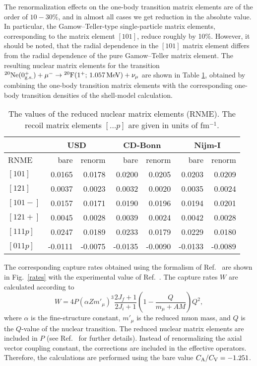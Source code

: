 \documentclass[12pt]{iopart}
\begin{document}
The renormalization effects on the one-body transition matrix elements are
of the order of $10-30\%$, and in almost all cases we get reduction in the
absolute value.
In particular, the Gamow--Teller-type single-particle matrix elements,
corresponding to the matrix element $[101]$, reduce roughly by 10\%. However, it
should be noted, that the radial dependence in the $[101]$ matrix element
differs from the radial dependence of the pure Gamow--Teller matrix element.
The resulting nuclear
matrix elements for the transition $^{20}{\rm Ne}(0^+_{\rm g.s.})+\mu^-
\to {}^{20}{\rm F}(1^+;\, 1.057\, {\rm MeV})+\nu_\mu$
are shown in Table \ref{nme}, obtained by combining the one-body transition
matrix elements with the corresponding one-body transition densities of the
shell-model calculation.
\begin{table}
\caption{The values of the reduced nuclear matrix elements (RNME). The recoil
        matrix elements $[\dots p]$ are given in units of fm$^{-1}$.}
\begin{indented}\item[]
\begin{tabular}{lrrrrrr}\hline
             &\multicolumn{2}{c}{USD} &\multicolumn{2}{c}{CD-Bonn}&
             \multicolumn{2}{c}{Nijm-I}\\\hline
        RNME & bare & renorm & bare & renorm& bare & renorm \\
        \hline
        $[101]$  &  0.0165 &  0.0178 &  0.0200 &  0.0205 &0.0203 &0.0209 \\
        $[121]$  &  0.0037 &  0.0023 &  0.0032 &  0.0020 &0.0035 &0.0024 \\
        $[101-]$ &  0.0157 &  0.0171 &  0.0190 &  0.0196 &0.0194 &0.0201\\
        $[121+]$ &  0.0045 &  0.0028 &  0.0039 &  0.0024 &0.0042 &0.0028\\
        $[111p]$ &  0.0247 &  0.0189 &  0.0233 &  0.0179 &0.0229 &0.0180\\
        $[011p]$ & -0.0111 & -0.0075 & -0.0135 & -0.0090 &-0.0133 &-0.0089\\
        \hline
\end{tabular}
\end{indented}
\label{nme}
\end{table}
The corresponding capture rates 
obtained using the formalism of Ref.\ \cite{mor60} are shown
in Fig.\ \ref{rates} with the experimental value of Ref.\ \cite{fil98}.
The capture rates $W$ are calculated according to
        \begin{equation}\label{W}
        W=4P(\alpha Zm'_\mu)^3\frac{2J_f+1}{2J_i+1}\left(1-\frac{Q}{m_\mu+
        AM}\right)Q^2,
        \end{equation}
where $\alpha$ is the fine-structure constant, $m'_\mu$ is the reduced muon
mass, and $Q$ is the $Q$-value of the nuclear transition. The reduced
nuclear matrix
elements are included in $P$ (see Ref.\ \cite{mor60} for further details).
Instead of renormalizing the axial vector coupling constant, the
corrections are included in the effective operators.
Therefore, the calculations are performed using the bare value $C_{\rm A}/
C_{\rm V}=-1.251$.
\end{document}
